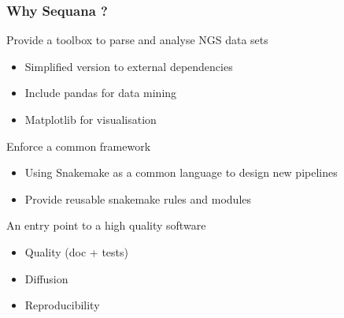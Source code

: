 \begin{frame}
    \frametitle{Why Sequana ?}


    \begin{block}{Provide a toolbox to parse and analyse NGS data sets }
    \begin{itemize}
        \item Simplified version to external dependencies
        \item Include pandas for data mining
        \item Matplotlib for visualisation
    \end{itemize}
    \end{block}

    \begin{block}{Enforce a common framework}
    \begin{itemize}
        \item Using Snakemake as a common language to design new pipelines
        \item Provide reusable snakemake rules and modules
    \end{itemize}
     \end{block}

    \begin{block}{An entry point to a high quality software}
    \begin{itemize}
        \item Quality (doc + tests)
        \item Diffusion
        \item Reproducibility
    \end{itemize}
    \end{block}

\end{frame}


